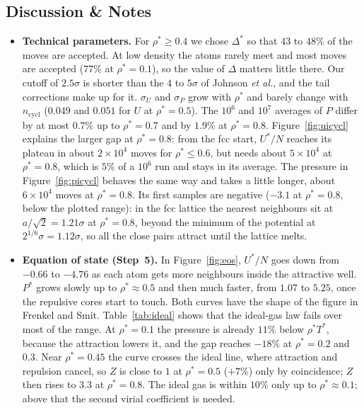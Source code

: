 \clearpage
\subsection{Discussion \& Notes}
\begin{itemize}
  \item \textbf{Technical parameters.} For $\rho^*\ge0.4$ we chose $\Delta^*$ so that $43$ to $48\%$ of the moves are accepted. At low density the atoms rarely meet and most moves are accepted ($77\%$ at $\rho^*=0.1$), so the value of $\Delta$ matters little there. Our cutoff of $2.5\sigma$ is shorter than the $4$ to $5\sigma$ of Johnson \emph{et al.}, and the tail corrections make up for it. $\sigma_U$ and $\sigma_P$ grow with $\rho^*$ and barely change with $n_{\mathrm{cycl}}$ ($0.049$ and $0.051$ for $U$ at $\rho^*=0.5$). The $10^6$ and $10^7$ averages of $P$ differ by at most $0.7\%$ up to $\rho^*=0.7$ and by $1.9\%$ at $\rho^*=0.8$. Figure~\ref{fig:uicycl} explains the larger gap at $\rho^*=0.8$: from the fcc start, $U^*/N$ reaches its plateau in about $2\times10^4$ moves for $\rho^*\le0.6$, but needs about $5\times10^4$ at $\rho^*=0.8$, which is $5\%$ of a $10^6$ run and stays in its average. The pressure in Figure~\ref{fig:picycl} behaves the same way and takes a little longer, about $6\times10^4$ moves at $\rho^*=0.8$. Its first samples are negative ($-3.1$ at $\rho^*=0.8$, below the plotted range): in the fcc lattice the nearest neighbours sit at $a/\sqrt2=1.21\sigma$ at $\rho^*=0.8$, beyond the minimum of the potential at $2^{1/6}\sigma=1.12\sigma$, so all the close pairs attract until the lattice melts.

  \item \textbf{Equation of state (Step~5).} In Figure~\ref{fig:eos}, $U^*/N$ goes down from $-0.66$ to $-4.76$ as each atom gets more neighbours inside the attractive well. $P^*$ grows slowly up to $\rho^*\approx0.5$ and then much faster, from $1.07$ to $5.25$, once the repulsive cores start to touch. Both curves have the shape of the figure in Frenkel and Smit. Table~\ref{tab:ideal} shows that the ideal-gas law fails over most of the range. At $\rho^*=0.1$ the pressure is already $11\%$ below $\rho^*T^*$, because the attraction lowers it, and the gap reaches $-18\%$ at $\rho^*=0.2$ and $0.3$. Near $\rho^*=0.45$ the curve crosses the ideal line, where attraction and repulsion cancel, so $Z$ is close to $1$ at $\rho^*=0.5$ ($+7\%$) only by coincidence; $Z$ then rises to $3.3$ at $\rho^*=0.8$. The ideal gas is within $10\%$ only up to $\rho^*\approx0.1$; above that the second virial coefficient is needed.


\end{itemize}
